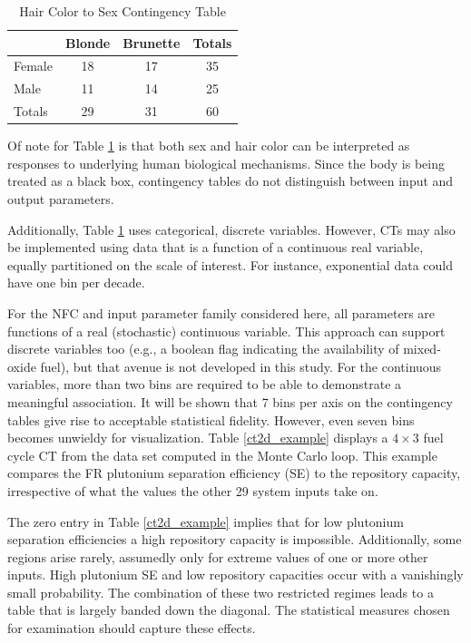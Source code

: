 \documentclass[preprint,12pt]{elsarticle}
\begin{document}
\begin{table}[htbp]
\begin{center}
\caption{Hair Color to Sex Contingency Table}
\label{biotable}
\begin{tabular}{|l||c|c||c|}
\hline
       & Blonde & Brunette & Totals \\
\hline
Female & 18     & 17       & 35 \\
\hline
Male   & 11     & 14       & 25 \\
\hline
Totals & 29     & 31       & 60 \\
\hline
\end{tabular}
\end{center}
\end{table}

Of note for Table \ref{biotable} is that both sex and hair color can be interpreted as responses to 
underlying human biological mechanisms.  Since the body is being treated as a black box, contingency 
tables do not distinguish between input and output parameters.

Additionally, Table \ref{biotable} uses categorical, discrete variables.  However, CTs may also be implemented using
data that is a function of a continuous real variable, equally partitioned on the scale of
interest. For instance, exponential data could have one bin per decade.

For the NFC and input parameter family considered here, all parameters are functions of a real 
(stochastic) continuous variable.  This approach can support discrete variables too (e.g., a 
boolean flag indicating the availability of mixed-oxide fuel), but that avenue is not developed 
in this study. For the continuous variables, more than two bins are required to
be able to demonstrate a meaningful association.  It will be shown that 7 bins per axis on the contingency 
tables give rise to acceptable statistical fidelity.  However, even seven bins becomes unwieldy for visualization.
Table \ref{ct2d_example} displays a $4\times 3$ fuel cycle CT from the data set computed in
the Monte Carlo loop.   This example compares the FR plutonium separation efficiency (SE) to the 
repository capacity, irrespective of what the values the other 29 system inputs take on.

%


The zero entry in Table \ref{ct2d_example} implies that for low plutonium separation efficiencies a 
high repository capacity is impossible.  Additionally, some regions arise rarely, assumedly only for 
extreme values of one or more other inputs. High plutonium SE and low repository capacities occur with 
a vanishingly small probability.  The combination of these two restricted regimes leads to a table that 
is largely banded down the diagonal. The statistical measures chosen for examination should capture these 
effects.
\end{document}
